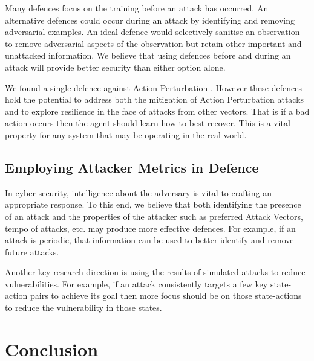 \documentclass[conference,compsoc]{IEEEtran}
\begin{document}
Many defences focus on the training before an attack has occurred. An alternative defences could occur during an attack by identifying and removing adversarial examples. An ideal defence would selectively sanitise an observation to remove adversarial aspects of the observation but retain other important and unattacked information. We believe that using defences before and during an attack will provide better security than either option alone.

We found a single defence against Action Perturbation \cite{tessler_action_2019}. However these defences hold the potential to address both the mitigation of Action Perturbation attacks and to explore resilience in the face of attacks from other vectors. That is if a bad action occurs then the agent should learn how to best recover. This is a vital property for any system that may be operating in the real world. 

\subsection{Employing Attacker Metrics in Defence}

In cyber-security, intelligence about the adversary is vital to crafting an appropriate response. To this end, we believe that both identifying the presence of an attack and the properties of the attacker such as preferred Attack Vectors, tempo of attacks, etc. may produce more effective defences. For example, if an attack is periodic, that information can be used to better identify and remove future attacks.

Another key research direction is using the results of simulated attacks to reduce vulnerabilities. For example, if an attack consistently targets a few key state-action pairs to achieve its goal then more focus should be on those state-actions to reduce the vulnerability in those states.


\section{Conclusion}
\end{document}
